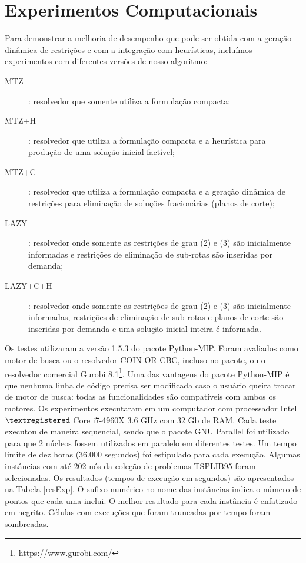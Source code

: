 \documentclass[a4paper,11pt,fleqn]{article}
\begin{document}
\section{Experimentos Computacionais} \label{secExp}

Para demonstrar a melhoria de desempenho que pode ser obtida com a geração
dinâmica de restrições e com a integração com heurísticas, incluímos
experimentos com diferentes versões de nosso algoritmo:

\begin{description}
	\item[\textsc{MTZ}]: resolvedor que somente utiliza a formulação compacta;
	\item[\textsc{MTZ+H}]: resolvedor que utiliza a formulação compacta e a heurística para produção de uma solução inicial factível;
	\item[\textsc{MTZ+C}]: resolvedor que utiliza a formulação compacta e a geração dinâmica de restrições para eliminação de soluções fracionárias (planos de corte);
	\item[\textsc{LAZY}]: resolvedor onde somente as restrições de grau (2) e (3) são inicialmente informadas e restrições de eliminação de sub-rotas são inseridas por demanda;
	\item[\textsc{LAZY+C+H}]: resolvedor onde somente as restrições de grau (2) e (3) são inicialmente informadas, restrições de eliminação de sub-rotas e planos de corte são inseridas por demanda e uma solução inicial inteira é informada.
\end{description}

Os testes utilizaram a versão 1.5.3 do pacote Python-MIP. Foram avaliados como motor de busca ou o resolvedor COIN-OR CBC, incluso no pacote, ou o resolvedor comercial Gurobi 8.1\footnote{\url{https://www.gurobi.com/}}. Uma das vantagens do pacote Python-MIP é que nenhuma linha de código precisa ser modificada caso o usuário queira trocar de motor de busca: todas as funcionalidades são compatíveis com ambos os motores. Os experimentos executaram em um computador com processador Intel $\textregistered$ Core i7-4960X 3.6 GHz com 32 Gb de RAM. Cada teste executou de maneira sequencial, sendo que o pacote GNU Parallel \citep{Tange2011} foi utilizado para que 2 núcleos fossem utilizados em paralelo em diferentes testes. Um tempo limite de dez horas (36.000 segundos) foi estipulado para cada execução. Algumas instâncias com até 202 nós da coleção de problemas TSPLIB95 \citep{Reinelt95} foram selecionadas. Os resultados (tempos de execução em segundos) são apresentados na Tabela \ref{resExp}. O sufixo numérico no nome das instâncias indica o número de pontos que cada uma inclui. O melhor resultado para cada instância é enfatizado em negrito. Células com execuções que foram truncadas por tempo foram sombreadas.
    
\end{document}

